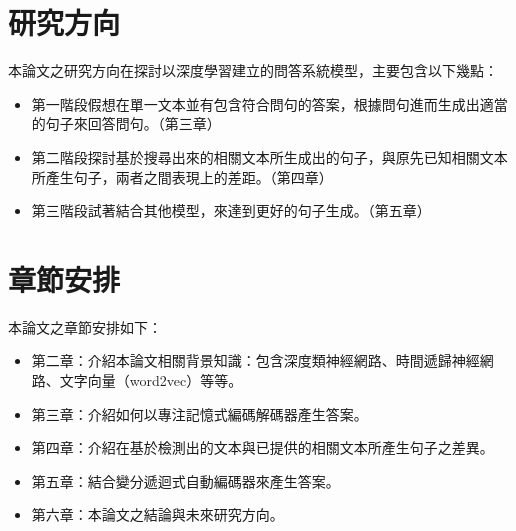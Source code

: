 \section{研究方向}
本論文之研究方向在探討以深度學習建立的問答系統模型，主要包含以下幾點：
\itemsep -2pt
\begin{itemize}
    \item 第一階段假想在單一文本並有包含符合問句的答案，根據問句進而生成出適當的句子來回答問句。（第三章）
    \item 第二階段探討基於搜尋出來的相關文本所生成出的句子，與原先已知相關文本所產生句子，兩者之間表現上的差距。（第四章）
    \item 第三階段試著結合其他模型，來達到更好的句子生成。（第五章）
\end{itemize}

\section{章節安排}
本論文之章節安排如下：
\begin{itemize}
\itemsep -2pt
    \item 第二章：介紹本論文相關背景知識：包含深度類神經網路、時間遞歸神經網路、文字向量（word2vec）等等。
    \item 第三章：介紹如何以專注記憶式編碼解碼器產生答案。
    \item 第四章：介紹在基於檢測出的文本與已提供的相關文本所產生句子之差異。%
    \item 第五章：結合變分遞迴式自動編碼器來產生答案。
    \item 第六章：本論文之結論與未來研究方向。
\end{itemize}
